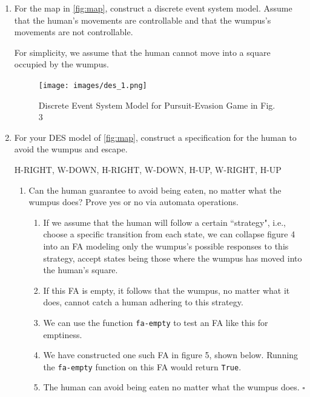 \documentclass[12pt,letterpaper]{ntdhw}
\begin{document}
\begin{enumerate}

  \item For the map in \ref{fig:map}, construct a discrete event
  system model.  Assume that the human's movements are controllable
  and that the wumpus's movements are not controllable.

  For simplicity, we assume that the human cannot move into a square occupied by the wumpus.

  \begin{figure}[ht]
      \centering
      \texttt{[image: images/des\_1.png]}
      \caption{Discrete Event System Model for Pursuit-Evasion Game in Fig. 3}
  \end{figure}

  \item For your DES model of \ref{fig:map}, construct a specification
  for the human to avoid the wumpus and escape.

    H-RIGHT, W-DOWN, H-RIGHT, W-DOWN, H-UP, W-RIGHT, H-UP
  
\clearpage

  \begin{enumerate}
    \item Can the human guarantee to avoid being eaten, no matter what
    the wumpus does?  Prove yes or no via automata operations.

    \begin{enumerate}
        \item If we assume that the human will follow a certain ``strategy", i.e., choose a specific transition from each state, we can collapse figure 4 into an FA modeling only the wumpus's possible responses to this strategy, accept states being those where the wumpus has moved into the human's square.
        \item If this FA is empty, it follows that the wumpus, no matter what it does, cannot catch a human adhering to this strategy.
        \item We can use the function \texttt{fa-empty} to test an FA like this for emptiness.
        \item We have constructed one such FA in figure 5, shown below. Running the \texttt{fa-empty} function on this FA would return \texttt{True}.
        \item The human can avoid being eaten no matter what the wumpus does. $\square$
    \end{enumerate}


\end{enumerate}
\end{enumerate}
\end{document}
